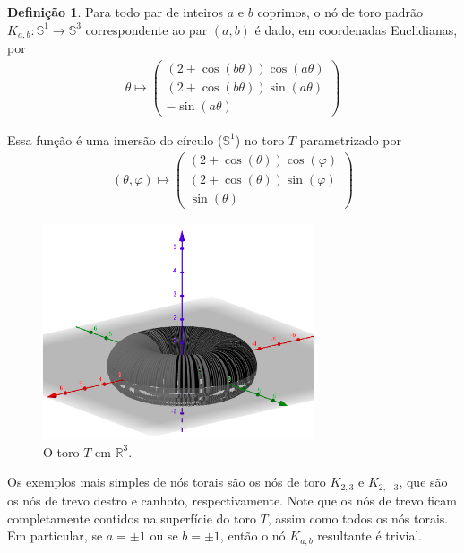 \documentclass[a4paper,portuguese,11pt,twoside, leqno]{book}
\theoremstyle{definition}
\newtheorem{deff}{Definição}[section]
\begin{document}
	\begin{deff}
		\label{def no de toro}
		Para todo par de inteiros $a$ e $b$ coprimos, o nó de toro padrão $K_{a,b}: \mathbb{S}^1\to\mathbb{S}^3$ correspondente ao par $(a,b)$ é dado, em coordenadas Euclidianas, por 
		\begin{align*}
		\theta\mapsto
		\left( 
		\begin{matrix}
		(2+\cos(b\theta))\cos(a\theta) \\
		(2+\cos(b\theta))\sin(a\theta) \\
		-\sin(a\theta)
		\end{matrix} 
		\right)
		\end{align*}	
	\end{deff}
	\par\vspace{0.3cm} Essa função é uma imersão do círculo ($\mathbb{S}^1$) no toro $T$ parametrizado por
	\begin{align*}
	(\theta, \varphi)\mapsto 
	\left( \begin{matrix}
	(2+\cos(\theta))\cos(\varphi) \\
	(2+\cos(\theta))\sin(\varphi) \\
	\sin(\theta)
	\end{matrix}  \right)
	\end{align*}
	\begin{figure}[H]
		\begin{center}
			\includegraphics[width=8cm]{toro.png}
		\end{center}\caption{O toro $T$ em $\mathbb{R}^3$.}\label{toro}
	\end{figure}
	\par\vspace{0.3cm} Os exemplos mais simples de nós torais são os nós de toro $K_{2,3}$ e $K_{2,-3}$, que são os nós de trevo destro e canhoto, respectivamente. Note que os nós de trevo ficam completamente contidos na superfície do toro $T$, assim como todos os nós torais. Em particular, se $a = \pm1$ ou se $b = \pm1$, então o nó $K_{a,b}$ resultante é trivial.
	
\end{document}
